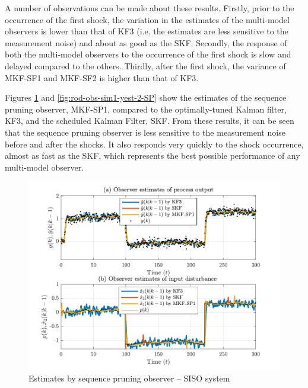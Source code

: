 A number of observations can be made about these results. Firstly, prior to the occurrence of the first shock, the variation in the estimates of the multi-model observers is lower than that of KF3 (i.e. the estimates are less sensitive to the measurement noise) and about as good as the SKF. Secondly, the response of both the multi-model observers to the occurrence of the first shock is slow and delayed compared to the others. Thirdly, after the first shock, the variance of MKF-SF1 and MKF-SF2 is higher than that of KF3.

Figures \ref{fig:rod-obs-sim1-yest-1-SP} and \ref{fig:rod-obs-sim1-yest-2-SP} show the estimates of the sequence pruning observer, MKF-SP1, compared to the optimally-tuned Kalman filter, KF3, and the scheduled Kalman Filter, SKF.  From these results, it can be seen that the sequence pruning observer is less sensitive to the measurement noise before and after the shocks. It also responds very quickly to the shock occurrence, almost as fast as the SKF, which represents the best possible performance of any multi-model observer.
\begin{figure}[htp]
	\centering
	\includegraphics[width=12cm]{images/rod_obs_sim1_all_seed_y_est1_SP1.pdf}
	\caption{Estimates by sequence pruning observer – SISO system}
	\label{fig:rod-obs-sim1-yest-1-SP}
\end{figure}


